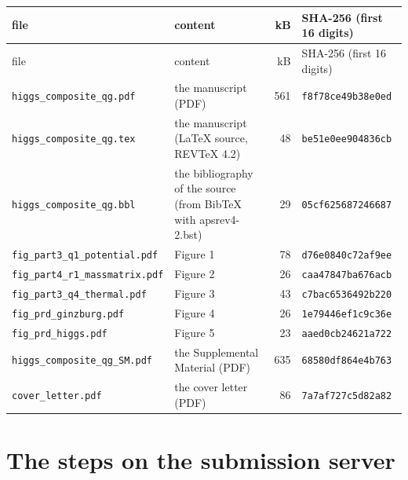 \documentclass[11pt]{article}
\begin{document}
\begingroup\small\setlength{\tabcolsep}{4pt}
\begin{longtable}{>{\raggedright\arraybackslash}p{}>{\raggedright\arraybackslash}p{}r>{\raggedright\arraybackslash}p{}}
\hline\hline file & content & kB & SHA-256 (first 16 digits) \\ \hline
\endfirsthead
\hline file & content & kB & SHA-256 (first 16 digits) \\ \hline
\endhead
\hline\hline
\endlastfoot
\texttt{higgs\_composite\_qg.pdf} & the manuscript (PDF) & 561 & \texttt{f8f78ce49b38e0ed} \\
\texttt{higgs\_composite\_qg.tex} & the manuscript (LaTeX source, REVTeX 4.2) & 48 & \texttt{be51e0ee904836cb} \\
\texttt{higgs\_composite\_qg.bbl} & the bibliography of the source (from BibTeX with apsrev4-2.bst) & 29 & \texttt{05cf625687246687} \\
\texttt{fig\_part3\_q1\_potential.pdf} & Figure 1 & 78 & \texttt{d76e0840c72af9ee} \\
\texttt{fig\_part4\_r1\_massmatrix.pdf} & Figure 2 & 26 & \texttt{caa47847ba676acb} \\
\texttt{fig\_part3\_q4\_thermal.pdf} & Figure 3 & 43 & \texttt{c7bac6536492b220} \\
\texttt{fig\_prd\_ginzburg.pdf} & Figure 4 & 26 & \texttt{1e79446ef1c9c36e} \\
\texttt{fig\_prd\_higgs.pdf} & Figure 5 & 23 & \texttt{aaed0cb24621a722} \\
\texttt{higgs\_composite\_qg\_SM.pdf} & the Supplemental Material (PDF) & 635 & \texttt{68580df864e4b763} \\
\texttt{cover\_letter.pdf} & the cover letter (PDF) & 86 & \texttt{7a7af727c5d82a82} \\
\end{longtable}
\endgroup

\section{The steps on the submission server}
\label{sec:steps}
\end{document}
